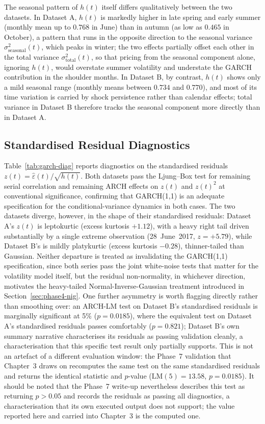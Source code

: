 The seasonal pattern of $h(t)$ itself differs qualitatively between the two datasets. In Dataset A, $h(t)$ is markedly higher in late spring and early summer (monthly mean up to $0.768$ in June) than in autumn (as low as $0.465$ in October), a pattern that runs in the opposite direction to the seasonal variance $\sigma^2_{\text{seasonal}}(t)$, which peaks in winter; the two effects partially offset each other in the total variance $\sigma^2_{\text{total}}(t)$, so that pricing from the seasonal component alone, ignoring $h(t)$, would overstate summer volatility and understate the GARCH contribution in the shoulder months. In Dataset B, by contrast, $h(t)$ shows only a mild seasonal range (monthly means between $0.734$ and $0.770$), and most of its time variation is carried by shock persistence rather than calendar effects; total variance in Dataset B therefore tracks the seasonal component more directly than in Dataset A.

\subsection{Standardised Residual Diagnostics}
\label{sec:phase3-diag}

Table~\ref{tab:garch-diag} reports diagnostics on the standardised residuals $z(t) = \hat\varepsilon(t)/\sqrt{h(t)}$. Both datasets pass the Ljung--Box test for remaining serial correlation and remaining ARCH effects on $z(t)$ and $z(t)^2$ at conventional significance, confirming that GARCH(1,1) is an adequate specification for the conditional-variance dynamics in both cases. The two datasets diverge, however, in the shape of their standardised residuals: Dataset A's $z(t)$ is leptokurtic (excess kurtosis $+1.12$), with a heavy right tail driven substantially by a single extreme observation (28~June~2017, $z = +5.79$), while Dataset B's is mildly platykurtic (excess kurtosis $-0.28$), thinner-tailed than Gaussian. Neither departure is treated as invalidating the GARCH(1,1) specification, since both series pass the joint white-noise tests that matter for the volatility model itself, but the residual non-normality, in whichever direction, motivates the heavy-tailed Normal-Inverse-Gaussian treatment introduced in Section~\ref{sec:phase4-nig}. One further asymmetry is worth flagging directly rather than smoothing over: an ARCH-LM test on Dataset B's standardised residuals is marginally significant at 5\% ($p = 0.0185$), where the equivalent test on Dataset A's standardised residuals passes comfortably ($p = 0.821$); Dataset B's own summary narrative characterises its residuals as passing validation cleanly, a characterisation that this specific test result only partially supports. This is not an artefact of a different evaluation window: the Phase~7 validation that Chapter~3 draws on recomputes the same test on the same standardised residuals and returns the identical statistic and $p$-value ($\mathrm{LM}(5) = 13.58$, $p = 0.0185$). It should be noted that the Phase~7 write-up nevertheless describes this test as returning $p > 0.05$ and records the residuals as passing all diagnostics, a characterisation that its own executed output does not support; the value reported here and carried into Chapter~3 is the computed one.

